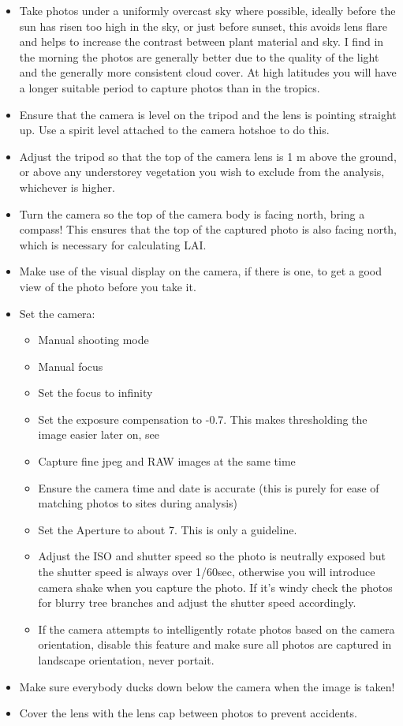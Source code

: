 \documentclass{article}
\begin{document}
\begin{itemize}
	\item{Take photos under a uniformly overcast sky where possible, ideally before the sun has risen too high in the sky, or just before sunset, this avoids lens flare and helps to increase the contrast between plant material and sky. I find in the morning the photos are generally better due to the quality of the light and the generally more consistent cloud cover. At high latitudes you will have a longer suitable period to capture photos than in the tropics.}
	\item{Ensure that the camera is level on the tripod and the lens is pointing straight up. Use a spirit level attached to the camera hotshoe to do this.}
	\item{Adjust the tripod so that the top of the camera lens is 1 m above the ground, or above any understorey vegetation you wish to exclude from the analysis, whichever is higher.} 
	\item{Turn the camera so the top of the camera body is facing north, bring a compass! This ensures that the top of the captured photo is also facing north, which is necessary for calculating LAI.}
	\item{Make use of the visual display on the camera, if there is one, to get a good view of the photo before you take it.}
	\item{Set the camera:}
		\begin{itemize}
			\item{Manual shooting mode}
			\item{Manual focus}
			\item{Set the focus to infinity}
			\item{Set the exposure compensation to -0.7. This makes thresholding the image easier later on, see \citet{Zhang2005}}
			\item{Capture fine jpeg and RAW images at the same time}
			\item{Ensure the camera time and date is accurate (this is purely for ease of matching photos to sites during analysis)}
			\item{Set the Aperture to about 7. This is only a guideline.}
			\item{Adjust the ISO and shutter speed so the photo is neutrally exposed but the shutter speed is always over 1/60sec, otherwise you will introduce camera shake when you capture the photo. If it's windy check the photos for blurry tree branches and adjust the shutter speed accordingly.}
			\item{If the camera attempts to intelligently rotate photos based on the camera orientation, disable this feature and make sure all photos are captured in landscape orientation, never portait.}
		\end{itemize}
	\item{Make sure everybody ducks down below the camera when the image is taken!}
	\item{Cover the lens with the lens cap between photos to prevent accidents.}
\end{itemize}
\end{document}
